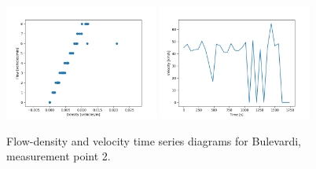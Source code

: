 \documentclass[english, 12pt, a4paper, elec, utf8, pdfa, online]{aaltothesis}
\begin{document}
\begin{figure}[ht!]
    \centering
    \includegraphics[width=0.45\textwidth]{graphs/Bulevardi_2_flw_dns.png}
    \includegraphics[width=0.45\textwidth]{graphs/Bulevardi_2_spd_time_6.png}
    \caption{Flow-density and velocity time series diagrams for Bulevardi, measurement point 2.}
\end{figure}
\end{document}
